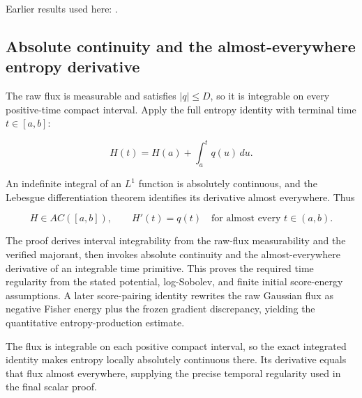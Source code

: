 \documentclass[11pt,a4paper]{report}
\begin{document}
Earlier results used here: \cite[Section~3.26.3]{LangevinLean2026ULASC}.
\subsection{\texorpdfstring{Absolute continuity and the almost-everywhere entropy derivative}{Absolute continuity and the almost-everywhere entropy derivative}}
\label{report-step-UnadjustedLangevin-LSI-GaussianEntropyIdentity-lean-22}


The raw flux is measurable and satisfies \(|q|\le D\), so it is integrable on every positive-time compact interval. Apply the full entropy identity with terminal time \(t\in[a,b]\):

\[H(t)=H(a)+\int_a^t q(u)\,du.\]

An indefinite integral of an \(L^1\) function is absolutely continuous, and the Lebesgue differentiation theorem identifies its derivative almost everywhere. Thus

\[H\in AC([a,b]),\qquad H'(t)=q(t)\quad\text{for almost every }t\in(a,b).\]

The proof derives interval integrability from the raw-flux measurability and the verified majorant, then invokes absolute continuity and the almost-everywhere derivative of an integrable time primitive. This proves the required time regularity from the stated potential, log-Sobolev, and finite initial score-energy assumptions. A later score-pairing identity rewrites the raw Gaussian flux as negative Fisher energy plus the frozen gradient discrepancy, yielding the quantitative entropy-production estimate.



The flux is integrable on each positive compact interval, so the exact integrated identity makes entropy locally absolutely continuous there. Its derivative equals that flux almost everywhere, supplying the precise temporal regularity used in the final scalar proof.
\end{document}

